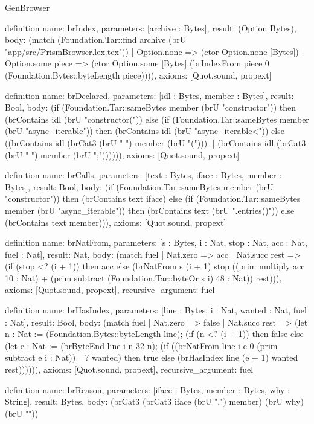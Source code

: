 \begin{lexlean}{GenBrowser}
\begin{semanticmodule}
{{definition{
  name: brIndex,
  parameters: [archive : Bytes],
  result: (Option Bytes),
  body: (match (Foundation.Tar::find archive (brU "app/src/PrismBrowser.lex.tex"))
    | Option.none => (ctor Option.none [Bytes])
    | Option.some piece => (ctor Option.some [Bytes] (brIndexFrom piece 0 (Foundation.Bytes::byteLength piece)))),
  axioms: [Quot.sound, propext]
}

definition{
  name: brDeclared,
  parameters: [idl : Bytes, member : Bytes],
  result: Bool,
  body: (if (Foundation.Tar::sameBytes member (brU "constructor")) then (brContains idl (brU "constructor(")) else (if (Foundation.Tar::sameBytes member (brU "async_iterable")) then (brContains idl (brU "async_iterable<")) else ((brContains idl (brCat3 (brU " ") member (brU "("))) || (brContains idl (brCat3 (brU " ") member (brU ";")))))),
  axioms: [Quot.sound, propext]
}

definition{
  name: brCalls,
  parameters: [text : Bytes, iface : Bytes, member : Bytes],
  result: Bool,
  body: (if (Foundation.Tar::sameBytes member (brU "constructor")) then (brContains text iface) else (if (Foundation.Tar::sameBytes member (brU "async_iterable")) then (brContains text (brU ".entries()")) else (brContains text member))),
  axioms: [Quot.sound, propext]
}

definition{
  name: brNatFrom,
  parameters: [s : Bytes, i : Nat, stop : Nat, acc : Nat, fuel : Nat],
  result: Nat,
  body: (match fuel
    | Nat.zero => acc
    | Nat.succ rest => (if (stop <? (i + 1)) then acc else (brNatFrom s (i + 1) stop ((prim multiply acc 10 : Nat) + (prim subtract (Foundation.Tar::byteOr s i) 48 : Nat)) rest))),
  axioms: [Quot.sound, propext],
  recursive_argument: fuel
}

definition{
  name: brHasIndex,
  parameters: [line : Bytes, i : Nat, wanted : Nat, fuel : Nat],
  result: Bool,
  body: (match fuel
    | Nat.zero => false
    | Nat.succ rest => (let n : Nat := (Foundation.Bytes::byteLength line); (if (n <? (i + 1)) then false else (let e : Nat := (brByteEnd line i n 32 n); (if ((brNatFrom line i e 0 (prim subtract e i : Nat)) =? wanted) then true else (brHasIndex line (e + 1) wanted rest)))))),
  axioms: [Quot.sound, propext],
  recursive_argument: fuel
}

definition{
  name: brReason,
  parameters: [iface : Bytes, member : Bytes, why : String],
  result: Bytes,
  body: (brCat3 (brCat3 iface (brU ".") member) (brU why) (brU "\n"))
}

}}
\end{semanticmodule}
\end{lexlean}
